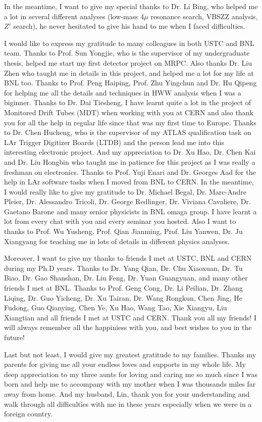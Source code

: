 \begin{acknowledgments}
In the meantime, I want to give my special thanks to Dr. Li Bing, who helped me a lot in several different analyses 
(low-mass 4$\mu$ resonance search, VBSZZ analysis, $Z'$ search), he never hesitated to give his hand to me when I faced difficulties.

I would like to express my gratitude to many colleagues in both USTC and BNL team.
Thanks to Prof. Sun Yongjie, who is the supervisor of my undergraduate thesis, helped me start my first detector project on MRPC. 
Also thanks Dr. Liu Zhen who taught me in details in this project, and helped me a lot for my life at BNL too.
Thanks to Prof. Peng Haiping, Prof. Zhu Yingchun and Dr. Hu Qipeng for helping me all the details and techniques in HWW analysis when I was a biginner.
Thanks to Dr. Dai Tiesheng, I have learnt quite a lot in the project of Monitored Drift Tubes (MDT) when working with you at CERN and also thank you for all the help in regular life since that was my first time to Europe.
Thanks to Dr. Chen Hucheng, who is the supervisor of my ATLAS qualification task on LAr Trigger Digitizer Boards (LTDB) and the person lead me into this interesting electronic project.
And my appreciation to Dr. Xu Hao, Dr. Chen Kai and Dr. Liu Hongbin who taught me in patience for this project as I was really a freshman on electronics.
Thanks to Prof. Yuji Enari and Dr. Georges Aad for the help in LAr software tasks when I moved from BNL to CERN.
In the meantime, I would really like to give my gratitude to Dr. Michael Begal, Dr. Marc-Andre Pleier, Dr. Alessandro Tricoli, Dr. George Redlinger, Dr. Viviana Cavaliere, Dr. Gaetano Barone and many senior physicists in BNL omaga group. 
I have learnt a lot from every chat with you and every seminar you hosted.
Also I want to thanks to Prof. Wu Yusheng, Prof. Qian Jianming, Prof. Liu Yanwen, Dr. Ju Xiangyang for teaching me in lots of details in different physics analyses.

Moreover, I want to give my thanks to friends I met at USTC, BNL and CERN during my Ph.D years.
Thanks to Dr. Yang Qian, Dr. Chu Xiaoxuan, Dr. Tu Biao, Dr. Gao Shanshan, Dr. Liu Feng, Dr. Yuan Guangyuan, and many other friends I met at BNL. 
Thanks to Prof. Geng Cong, Dr. Li Peilian, Dr. Zhang Liqing, Dr. Guo Yicheng, Dr. Xu Tairan, Dr. Wang Rongkun, Chen Jing, He Fudong, Guo Qianying, Chen Ye, Xu Hao, Wang Tao, Xie Xiangyu, Liu Xiangtian and all friends I met at USTC and CERN. 
Thank you all my friends! I will always remember all the happiniess with you, and best wishes to you in the future!

Last but not least, I would give my greatest gratitude to my families. Thanks my parents for giving me all your endless loves and supports in my whole life.
My deep appreciation to my three aunts for loving and caring me so much since I was born and help me to accompany with my mother when I was thousands miles far away from home.
And my husband, Lin, thank you for your understanding and walk through all difficulties with me in these years especially when we were in a foreign country.

\end{acknowledgments}
